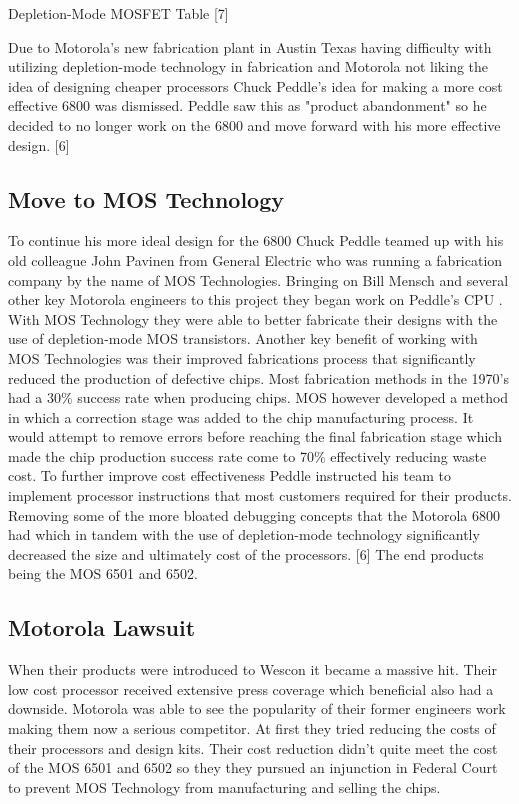 \documentclass[journal]{IEEEtran}
\begin{document}
\centerline{Depletion-Mode MOSFET Table [7]}

Due to Motorola's new fabrication plant in Austin Texas having difficulty with 
utilizing depletion-mode technology in fabrication and Motorola not liking the idea of designing 
cheaper processors Chuck Peddle's idea for making a more cost effective 6800 was dismissed.  
Peddle saw this as "product abandonment" so he decided to no longer work on the 6800 and 
move forward with his more effective design.  [6]

\subsection{Move to MOS Technology}
To continue his more ideal design for the 6800 Chuck Peddle teamed up with his old colleague John Pavinen 
from General Electric who was running a fabrication company by the name of MOS Technologies.  Bringing on
Bill Mensch and several other key Motorola engineers to this project they began work on Peddle's CPU .  
With MOS Technology they were able to better fabricate their designs with the use of depletion-mode MOS 
transistors.  Another key benefit of working with MOS Technologies was their improved fabrications process
that significantly reduced the production of defective chips.  Most fabrication methods in the 1970's 
had a 30\% success rate when producing chips.  MOS however developed a method in which a correction stage was 
added to the chip manufacturing process. It would attempt to remove errors before reaching the final 
fabrication stage which made the chip production success rate come to 70\% effectively reducing waste cost.  
To further improve cost effectiveness Peddle instructed his team to implement processor instructions that 
most customers required for their products.  Removing some of the more bloated debugging concepts that the 
Motorola 6800 had which in tandem with the use of depletion-mode technology significantly decreased the size
and ultimately cost of the processors. [6]  The end products being the MOS 6501 and 6502.   

\subsection{Motorola Lawsuit}
When their products were introduced to Wescon it became a massive hit.  Their low cost processor
received extensive press coverage which beneficial also had a downside.  Motorola was able to see the 
popularity of their former engineers work making them now a serious competitor.  At first they tried 
reducing the costs of their processors and design kits.  Their cost reduction didn't quite meet the cost of 
the MOS 6501 and 6502 so they they pursued an injunction in Federal Court to prevent MOS Technology from 
manufacturing and selling the chips.  
\end{document}
